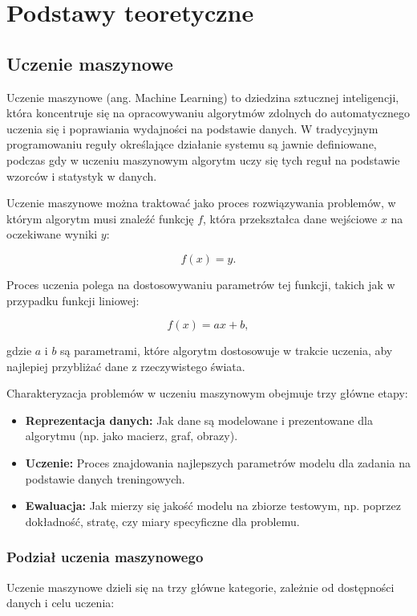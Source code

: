 \chapter{Podstawy teoretyczne}

\section{Uczenie maszynowe}

Uczenie maszynowe (ang. Machine Learning) to dziedzina sztucznej inteligencji, która koncentruje się na opracowywaniu algorytmów zdolnych do automatycznego uczenia się i poprawiania wydajności na podstawie danych. W tradycyjnym programowaniu reguły określające działanie systemu są jawnie definiowane, podczas gdy w uczeniu maszynowym algorytm uczy się tych reguł na podstawie wzorców i statystyk w danych.

Uczenie maszynowe można traktować jako proces rozwiązywania problemów, w którym algorytm musi znaleźć funkcję \( f \), która przekształca dane wejściowe \( x \) na oczekiwane wyniki \( y \):

\[
	f(x) = y.
\]

Proces uczenia polega na dostosowywaniu parametrów tej funkcji, takich jak w przypadku funkcji liniowej:

\[
	f(x) = ax + b,
\]

gdzie \( a \) i \( b \) są parametrami, które algorytm dostosowuje w trakcie uczenia, aby najlepiej przybliżać dane z rzeczywistego świata.

Charakteryzacja problemów w uczeniu maszynowym obejmuje trzy główne etapy:
\begin{itemize}
	\item \textbf{Reprezentacja danych:} Jak dane są modelowane i prezentowane dla algorytmu (np. jako macierz, graf, obrazy).
	\item \textbf{Uczenie:} Proces znajdowania najlepszych parametrów modelu dla zadania na podstawie danych treningowych.
	\item \textbf{Ewaluacja:} Jak mierzy się jakość modelu na zbiorze testowym, np. poprzez dokładność, stratę, czy miary specyficzne dla problemu.
\end{itemize}

\subsection{Podział uczenia maszynowego}

Uczenie maszynowe dzieli się na trzy główne kategorie, zależnie od dostępności danych i celu uczenia:

